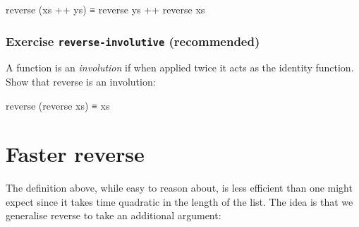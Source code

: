 \begin{myDisplay}
reverse (xs ++ ys) ≡ reverse ys ++ reverse xs
\end{myDisplay}

\hypertarget{exercise-reverse-involutive-recommended}{%
\subsubsection{\texorpdfstring{Exercise \texttt{reverse-involutive}
(recommended)}{Exercise reverse-involutive (recommended)}}\label{exercise-reverse-involutive-recommended}}

A function is an \emph{involution} if when applied twice it acts as the
identity function. Show that reverse is an involution:

\begin{myDisplay}
reverse (reverse xs) ≡ xs
\end{myDisplay}

\hypertarget{faster-reverse}{%
\section{Faster reverse}\label{faster-reverse}}

The definition above, while easy to reason about, is less efficient than
one might expect since it takes time quadratic in the length of the
list. The idea is that we generalise reverse to take an additional
argument:

\begin{fence}
\begin{code}%
\>[0]\AgdaSpace{}%
\AgdaSymbol{:}\AgdaSpace{}%
\AgdaSpace{}%
\AgdaSymbol{\{}\AgdaSpace{}%
\AgdaSymbol{:}\AgdaSpace{}%
\AgdaSymbol{\}}\AgdaSpace{}%
\AgdaSpace{}%
\AgdaSpace{}%
\AgdaSpace{}%
\AgdaSpace{}%
\AgdaSpace{}%
\AgdaSpace{}%
\AgdaSpace{}%
\AgdaSpace{}%
\<%
\\
\>[0]\AgdaSpace{}%
\AgdaInductiveConstructor{[]}%
\>[15]%
\>[19]\AgdaSymbol{=}%
\>[22]\<%
\\
\>[0]\AgdaSpace{}%
\AgdaSymbol{(}\AgdaSpace{}%
\AgdaSpace{}%
\AgdaSymbol{)}\AgdaSpace{}%
%
\>[19]\AgdaSymbol{=}%
\>[22]\AgdaSpace{}%
\AgdaSpace{}%
\AgdaSymbol{(}\AgdaSpace{}%
\AgdaSpace{}%
\AgdaSymbol{)}\<%
\end{code}
\end{fence}

